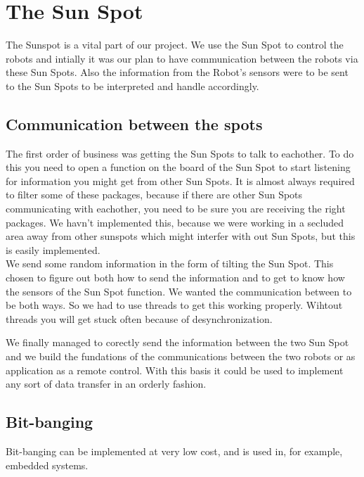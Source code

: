 \documentclass[a4,english]{article}
\begin{document}
\section{The Sun Spot}
The Sunspot is a vital part of our project. We use the Sun Spot to control the robots and intially it was our plan to have communication between the robots via these Sun Spots. Also the information from the Robot's  sensors were to be sent to the Sun Spots to be interpreted and handle accordingly.
\subsection{Communication between the spots} 
The first order of business was getting the Sun Spots to talk to eachother. To do this you need to open a function on the board of the Sun Spot to start listening for information you might get from other Sun Spots. It is almost always required to filter some of these packages, because if there are other Sun Spots communicating with eachother, you need to be sure you are receiving the right packages. We havn't implemented this, because we were working in a secluded area away from other sunspots which might interfer with out Sun Spots, but this is easily implemented. \\

We send some random information in the form of tilting the Sun Spot. This chosen to figure out both how to send the information and to get to know how the sensors of the Sun Spot function. We wanted the communication between to be both ways. So we had to use threads to get this working properly. Wihtout threads you will get stuck often because of desynchronization. 

We finally managed to corectly send the information between the two Sun Spot and we build the fundations of the communications between the two robots or as application as a remote control. With this basis it could be used to implement any sort of data transfer in an orderly fashion.  

\subsection{Bit-banging}
Bit-banging can be implemented at very low cost, and is used in, for example, embedded systems.\\
\end{document}
